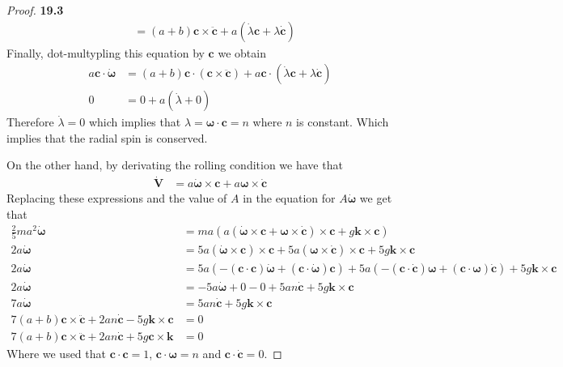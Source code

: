 \documentclass[11pt]{article}
\newcommand{\uvk}{\bm{k}}
\theoremstyle{definition}
\begin{document}
\begin{proof}{\textbf{19.3}}
\begin{align*}
        &= (a + b)\bm{c} \times \bm{\ddot c} + a(\dot\lambda\bm{c} + \lambda\bm{\dot c})
    \end{align*}
    Finally, dot-multypling this equation by $\bm{c}$ we obtain
    \begin{align*}
        a\bm{c}\cdot\bm{\dot \omega}
        &= (a + b)\bm{c}\cdot(\bm{c} \times \bm{\ddot c})
        + a\bm{c}\cdot(\dot\lambda\bm{c} + \lambda\bm{\dot c})\\
        0 &= 0 + a(\dot\lambda + 0)
    \end{align*}
    Therefore $\dot\lambda = 0$ which implies that
    $\lambda = \bm{\omega} \cdot \bm{c} = n$ where $n$ is constant.
    Which implies that the radial spin is conserved.

    On the other hand, by derivating the rolling condition we have that
    \begin{align*}
        \bm{\dot V}
        &= a\bm{\dot \omega} \times \bm{c} + a\bm{\omega} \times \bm{\dot c}
    \end{align*}
    Replacing these expressions and the value of $A$ in the equation for
    $A\bm{\dot\omega}$ we get that
    \begin{align*}
        \frac{2}{5}ma^2\bm{\dot{\omega}}
        &= ma(a(\bm{\dot \omega} \times \bm{c} + \bm{\omega} \times \bm{\dot c})
        \times \bm{c} + g\uvk \times \bm{c})\\
        2a\bm{\dot{\omega}}
        &= 5a(\bm{\dot \omega} \times \bm{c})\times\bm{c}
        + 5a(\bm{\omega} \times \bm{\dot c})\times \bm{c}
        + 5g\uvk \times \bm{c}\\
        2a\bm{\dot{\omega}}
        &= 5a(
            -(\bm{c}\cdot\bm{c})\bm{\dot \omega}
            + (\bm{c}\cdot\bm{\dot\omega})\bm{c}
        )
        + 5a(
            -(\bm{c}\cdot\bm{\dot c})\bm{\omega}
            + (\bm{c}\cdot\bm{\omega})\bm{\dot c}
        )
        + 5g\uvk \times \bm{c}\\
        2a\bm{\dot{\omega}}
        &= - 5a\bm{\dot \omega} + 0 - 0 + 5an\bm{\dot c} + 5g\uvk \times \bm{c}\\
        7a\bm{\dot{\omega}}
        &= 5an\bm{\dot c} + 5g\uvk \times \bm{c}\\
        7(a + b)\bm{c} \times \bm{\ddot c} + 2an\bm{\dot c}
        - 5g\uvk \times \bm{c} &= 0\\
        7(a + b)\bm{c} \times \bm{\ddot c} + 2an\bm{\dot c}
        + 5g\bm{c}\times\uvk &= 0
    \end{align*}
    Where we used that $\bm{c} \cdot \bm{c} = 1$, $\bm{c} \cdot \bm{\omega} = n$
    and $\bm{c} \cdot \bm{\dot c} = 0$.
    

\end{proof}
\end{document}
